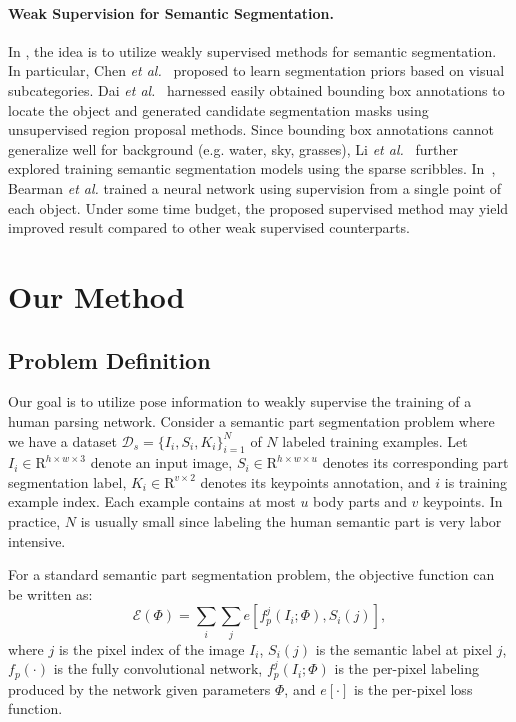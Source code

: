 \documentclass[10pt,twocolumn,letterpaper]{article}
\begin{document}
\paragraph{Weak Supervision for Semantic Segmentation.}
In \cite{pathak2014fully,chen2014enriching,papandreou2015weakly,dai2015boxsup,lin2016scribblesup,bearman2016s}, the idea is to utilize weakly supervised methods for semantic segmentation. In particular, Chen \emph{et al.}~\cite{chen2014enriching} proposed to learn segmentation priors based on visual subcategories. Dai \emph{et al.}~\cite{dai2015boxsup} harnessed easily obtained bounding box annotations to locate the object and generated candidate segmentation masks using unsupervised region proposal methods. Since bounding box annotations cannot generalize well for background (e.g. water, sky, grasses), Li \emph{et al.}~\cite{lin2016scribblesup} further explored training semantic segmentation models using the sparse scribbles. In~\cite{bearman2016s}, Bearman \emph{et al.} trained a neural network using supervision from a single point of each object. Under some time budget, the proposed supervised method may yield improved result compared to other weak supervised counterparts.

\section{Our Method}
\subsection{Problem Definition}
Our goal is to utilize pose information to weakly supervise the training of a human parsing network. Consider a semantic part segmentation problem where we have a dataset $\mathcal{D}_{s} = \{I_{i}, S_{i}, K_{i}\}_{i=1}^{N}$ of $N$ labeled training examples. Let $I_{i} \in \mathrm{R}^{h\times w \times 3}$ denote an input image, $S_{i} \in \mathrm{R}^{h\times w \times u}$ denotes its corresponding part segmentation label, $K_{i}\in \mathrm{R}^{v\times 2}$ denotes its keypoints annotation, and $i$ is training example index. Each example contains at most $u$ body parts and $v$ keypoints. In practice, $N$ is usually small since labeling the human semantic part is very labor intensive.

For a standard semantic part segmentation problem, the objective function can be written as:
\begin{equation}
\mathcal{E}(\Phi) = \sum_{i} \sum_{j}e[f_{p}^{j}(I_{i};\Phi),S_{i}(j)],
\label{eq:seg}
\end{equation}
where $j$ is the pixel index of the image $I_{i}$, $S_{i}(j)$ is the semantic label at pixel $j$, $f_{p}(\cdot)$ is the fully convolutional network, $f_{p}^{j}(I_{i};\Phi)$ is the per-pixel labeling produced by the network given parameters $\Phi$, and $e[\cdot]$ is the per-pixel loss function.
\end{document}
